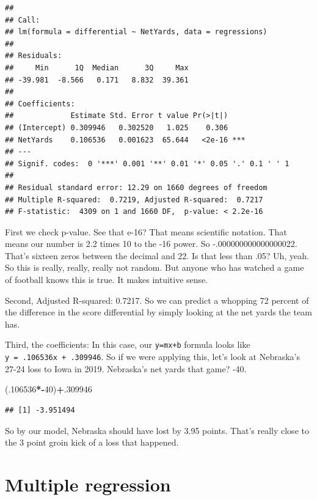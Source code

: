 \documentclass[
]{book}
\newenvironment{Shaded}{\begin{snugshade}}{\end{snugshade}}
\newcommand{\DecValTok}[1]{\textcolor[rgb]{0.00,0.00,0.81}{#1}}
\newcommand{\NormalTok}[1]{#1}
\newcommand{\OperatorTok}[1]{\textcolor[rgb]{0.81,0.36,0.00}{\textbf{#1}}}
\begin{document}
\begin{verbatim}
## 
## Call:
## lm(formula = differential ~ NetYards, data = regressions)
## 
## Residuals:
##     Min      1Q  Median      3Q     Max 
## -39.981  -8.566   0.171   8.832  39.361 
## 
## Coefficients:
##             Estimate Std. Error t value Pr(>|t|)    
## (Intercept) 0.309946   0.302520   1.025    0.306    
## NetYards    0.106536   0.001623  65.644   <2e-16 ***
## ---
## Signif. codes:  0 '***' 0.001 '**' 0.01 '*' 0.05 '.' 0.1 ' ' 1
## 
## Residual standard error: 12.29 on 1660 degrees of freedom
## Multiple R-squared:  0.7219,	Adjusted R-squared:  0.7217 
## F-statistic:  4309 on 1 and 1660 DF,  p-value: < 2.2e-16
\end{verbatim}

First we check p-value. See that e-16? That means scientific notation. That means our number is 2.2 times 10 to the -16 power. So -.000000000000000022. That's sixteen zeros between the decimal and 22. Is that less than .05? Uh, yeah. So this is really, really, really not random. But anyone who has watched a game of football knows this is true. It makes intuitive sense.

Second, Adjusted R-squared: 0.7217. So we can predict a whopping 72 percent of the difference in the score differential by simply looking at the net yards the team has.

Third, the coefficients: In this case, our \texttt{y=mx+b} formula looks like \texttt{y\ =\ .106536x\ +\ .309946}. So if we were applying this, let's look at Nebraska's 27-24 loss to Iowa in 2019. Nebraska's net yards that game? -40.

\begin{Shaded}
\begin{Highlighting}[]
\NormalTok{(.}\DecValTok{106536}\OperatorTok{*-}\DecValTok{40}\NormalTok{)}\OperatorTok{+}\NormalTok{.}\DecValTok{309946} 
\end{Highlighting}
\end{Shaded}

\begin{verbatim}
## [1] -3.951494
\end{verbatim}

So by our model, Nebraska should have lost by 3.95 points. That's really close to the 3 point groin kick of a loss that happened.

\hypertarget{multiple-regression}{%
\chapter{Multiple regression}\label{multiple-regression}}
\end{document}
